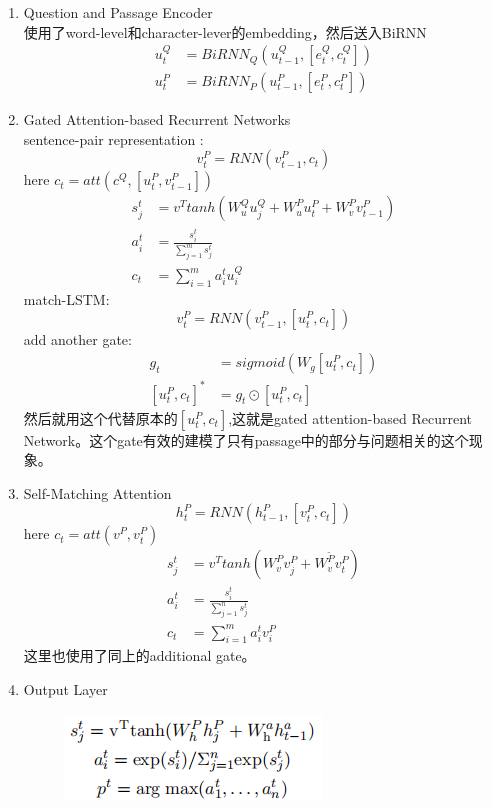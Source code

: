 \documentclass[a4paper,UTF8]{article}
\numberwithin{equation}{section}
\begin{document}
\begin{enumerate}
	\item Question and Passage Encoder\\使用了word-level和character-lever的embedding，然后送入BiRNN
	\begin{align*}
		u_t^Q&=BiRNN_Q(u_{t-1}^Q,[e_t^Q,c_t^Q])\\
		u_t^P&=BiRNN_P(u_{t-1}^P,[e_t^P,c_t^P])
	\end{align*}
	\item Gated Attention-based Recurrent Networks\\
	sentence-pair representation :
	$$v_t^P=RNN(v_{t-1}^P,c_t)$$here $c_t = att(c^Q,[u_t^P,v_{t-1}^P])$
	\begin{align*}
		s_j^t&=v^Ttanh(W_u^Qu_j^Q+W_u^Pu_t^P+W_v^Pv^P_{t-1})\\
		a_i^t&=\frac{s_i^t}{\sum_{j=1}^{m}s_j^t}\\
		c_t&=\sum_{i=1}^{m}a_i^tu_i^Q
	\end{align*}
	match-LSTM:\\$$v_t^P = RNN(v_{t-1}^P,[u_t^P,c_t])$$
	add another gate:\\
	\begin{align*}
		g_t&=sigmoid(W_g[u_t^P,c_t])\\
		[u_t^P,c_t]^*&=g_t\odot[u_t^P,c_t]
	\end{align*}
	然后就用这个代替原本的$[u_t^P,c_t]$,这就是gated attention-based Recurrent Network。这个gate有效的建模了只有passage中的部分与问题相关的这个现象。
	\item Self-Matching Attention\\
	$$h_t^P=RNN(h_{t-1}^P,[v_t^P,c_t])$$here $c_t = att(v^P,v_t^P)$
	\begin{align*}
		s_j^t&=v^Ttanh(W_v^Pv_j^P+W_v^{\tilde{P}}v_t^P)\\
		a_i^t&=\frac{s_i^t}{\sum_{j=1}^{n}s_j^t}\\
		c_t&=\sum_{i=1}^{m}a_i^tv_i^P
	\end{align*}
	这里也使用了同上的additional gate。
	\item Output Layer\\
	\begin{figure}[H]
		\centering
		\includegraphics[]{4-2.png}
	\end{figure}

\end{enumerate}
\end{document}
